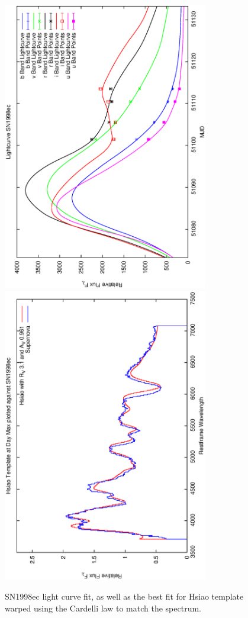 \clearpage

\begin{figure}[p]
\centering
\includegraphics[angle=-90,width=0.8\textwidth]{./figures/ltcv/SN1998ec_v027_lightcurve.ps}
\hfill
\includegraphics[angle=-90,width=0.8\textwidth]{./figures/hsiao/SN1998ec_v001_hsiao.ps}
\hfill
\caption{SN1998ec light curve fit, as well as the best fit for Hsiao template warped using the Cardelli law to match the spectrum.}
\label{fig:SN1998ecfour2}
\end{figure}

